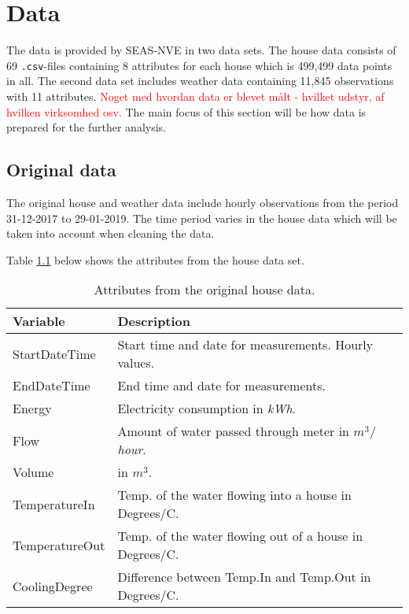 \chapter{Data}
The data is provided by SEAS-NVE in two data sets. The house data consists of 69 \texttt{.csv}-files containing 8 attributes for each house which is 499,499 data points in all. The second data set includes weather data containing 11,845 observations with 11 attributes. \textcolor{red}{Noget med hvordan data er blevet målt - hvilket udstyr, af hvilken virksomhed osv.} 
The main focus of this section will be how data is prepared for the further analysis. 

\section{Original data}
The original house and weather data include hourly observations from the period 31-12-2017 to 29-01-2019. The time period varies in the house data which will be taken into account when cleaning the data. 

Table \ref{tab: housedata} below shows the attributes from the house data set. 
\begin{table}[H]
    \centering
    \begin{tabular}{ll}
     \hline
     \textbf{Variable} & \textbf{Description} \\
    \hline
    \hline
    StartDateTime  &  Start time and date for measurements. Hourly values.\\
    EndDateTime  &  End time and date for measurements.\\
    Energy  &  Electricity consumption in \textit{kWh}.\\
    Flow  &  Amount of water passed through meter in \textit{$m^3/$hour}.\\
    Volume & in $m^3$.\\
    TemperatureIn  &  Temp. of the water flowing into a house in Degrees/C. \\
    TemperatureOut  & Temp. of the water flowing out of a house in Degrees/C.\\
    CoolingDegree  &  Difference between Temp.In and Temp.Out in Degrees/C. \\
    \hline
    \end{tabular}
    \caption{Attributes from the original house data.}
    \label{tab: housedata}
\end{table}

